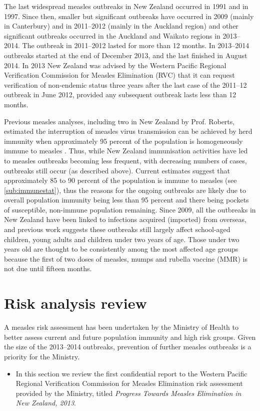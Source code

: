 \documentclass{article}
\begin{document}
The last widespread measles outbreaks in New Zealand occurred in 1991 and in 1997. Since then, smaller but significant outbreaks have occurred in 2009 (mainly in Canterbury) and in 2011--2012 (mainly in the Auckland region) and other significant outbreaks occurred in the Auckland and Waikato regions in 2013--2014. The outbreak in 2011--2012 lasted for more than 12 months. In 2013--2014 outbreaks started at the end of December 2013, and the last finished in August 2014. In 2013 New Zealand was advised by the Western Pacific Regional Verification Commission for Measles Elimination (RVC) that it can request verification of non-endemic status three years after the last case of the 2011--12 outbreak in June 2012, provided any subsequent outbreak lasts less than 12 months.

Previous measles analyses, including two in New Zealand by Prof. Roberts, estimated the interruption of measles virus transmission can be achieved by herd immunity when approximately 95 percent of the population is homogeneously immune to measles \citep{roberts0,roberts4}. Thus, while New Zealand immunisation activities have led to measles outbreaks becoming less frequent, with decreasing numbers of cases, outbreaks still occur (as described above). Current estimates suggest that approximately 85 to 90 percent of the population is immune to measles (see \autoref{sub:immunestat}), thus the reasons for the ongoing outbreaks are likely due to overall population immunity being less than 95 percent and there being pockets of susceptible, non-immune population remaining. Since 2009, all the outbreaks in New Zealand have been linked to infections acquired (imported) from overseas, and previous work suggests these outbreaks still largely affect school-aged children, young adults and children under two years of age. Those under two years old are thought to be consistently among the most affected age groups because the first of two doses of measles, mumps and rubella vaccine (MMR) is not due until fifteen months.

\section{Risk analysis review}

A measles risk assessment has been undertaken by the Ministry of Health to better assess current and future population immunity and high risk groups. Given the size of the 2013--2014 outbreaks, prevention of further measles outbreaks is a priority for the Ministry.
\begin{itemize}
\item In this section we review the first confidential report to the Western Pacific Regional Verification Commission for Measles Elimination risk assessment provided by the Ministry, titled \emph {Progress Towards Measles Elimination in New Zealand, 2013}.
\end{itemize}
\end{document}

